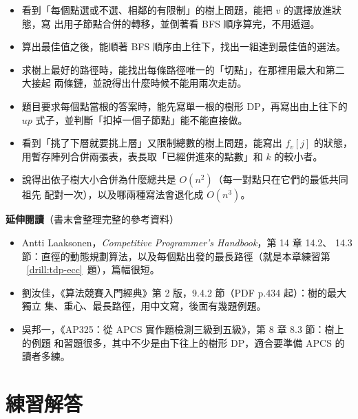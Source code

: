 \begin{itemize}
\item 看到「每個點選或不選、相鄰的有限制」的樹上問題，能把 $v$ 的選擇放進狀態，寫
出用子節點合併的轉移，並倒著看 BFS 順序算完，不用遞迴。
\item 算出最佳值之後，能順著 BFS 順序由上往下，找出一組達到最佳值的選法。
\item 求樹上最好的路徑時，能找出每條路徑唯一的「切點」，在那裡用最大和第二大接起
兩條鏈，並說得出什麼時候不能用兩次走訪。
\item 題目要求每個點當根的答案時，能先寫單一根的樹形 DP，再寫出由上往下的
$\mathit{up}$ 式子，並判斷「扣掉一個子節點」能不能直接做。
\item 看到「挑了下層就要挑上層」又限制總數的樹上問題，能寫出 $f_v[j]$ 的狀態，
用暫存陣列合併兩張表，表長取「已經併進來的點數」和 $k$ 的較小者。
\item 說得出依子樹大小合併為什麼總共是 $O(n^2)$（每一對點只在它們的最低共同祖先
配對一次），以及哪兩種寫法會退化成 $O(n^3)$。
\end{itemize}

\textbf{延伸閱讀}（書末會整理完整的參考資料）

\begin{itemize}
\item Antti Laaksonen，\textit{Competitive Programmer's Handbook}，第 14 章 14.2、
14.3 節：直徑的動態規劃算法，以及每個點出發的最長路徑（就是本章練習第
~\ref{drill:tdp-ecc}~題），篇幅很短。
\item 劉汝佳，《算法競賽入門經典》第 2 版，9.4.2 節（PDF p.434 起）：樹的最大獨立
集、重心、最長路徑，用中文寫，後面有幾題例題。
\item 吳邦一，《AP325：從 APCS 實作題檢測三級到五級》，第 8 章 8.3 節：樹上的例題
和習題很多，其中不少是由下往上的樹形 DP，適合要準備 APCS 的讀者多練。
\end{itemize}

\section*{練習解答}

